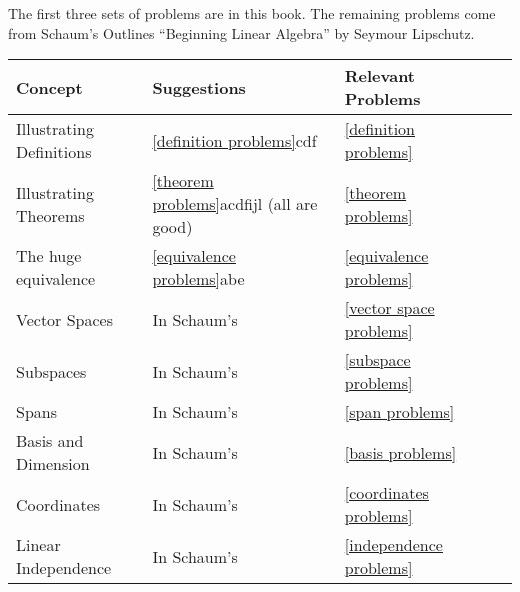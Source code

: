 The first three sets of problems are in this book.  The remaining problems come from Schaum's Outlines ``Beginning Linear Algebra'' by Seymour Lipschutz.  
\begin{center}
\begin{tabular}{|l|l|l|l|l|}
\hline
Concept&Suggestions&Relevant Problems\\ \hline
Illustrating Definitions
	&\ref{definition problems}cdf
  &\ref{definition problems}
  \\ \hline
Illustrating Theorems
	& \ref{theorem problems}acdfijl (all are good)  
	&\ref{theorem problems}
	\\ \hline
The huge equivalence
	&\ref{equivalence problems}abe 
	&\ref{equivalence problems}
	\\ \hline
Vector Spaces
	& In Schaum's
	&\ref{vector space problems}
	\\ \hline
Subspaces
	& In Schaum's
	&\ref{subspace problems}
	\\ \hline
Spans
	&In Schaum's
	&\ref{span problems}
	\\ \hline
Basis and Dimension
	&In Schaum's
	&\ref{basis problems}
	\\ \hline
Coordinates
	&In Schaum's
	&\ref{coordinates problems}
	\\ \hline
Linear Independence
	&In Schaum's
	&\ref{independence problems}
	\\ \hline
\end{tabular}
\end{center}
